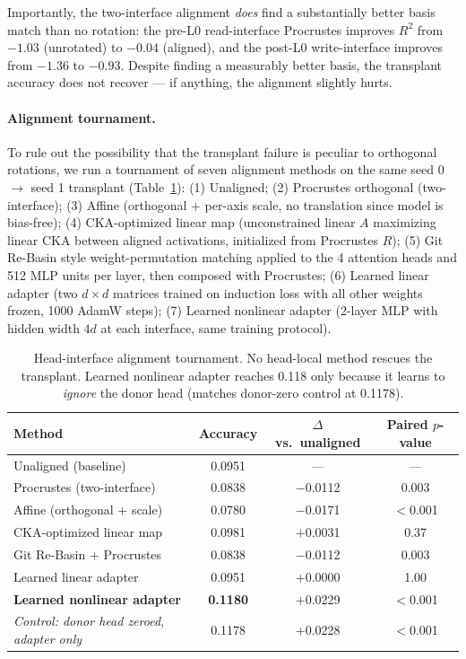 \documentclass[final]{article}
\begin{document}
Importantly, the two-interface alignment \emph{does} find a substantially
better basis match than no rotation: the pre-L0 read-interface Procrustes
improves $R^2$ from $-1.03$ (unrotated) to $-0.04$ (aligned), and the post-L0
write-interface improves from $-1.36$ to $-0.93$. Despite finding a measurably
better basis, the transplant accuracy does not recover --- if anything, the
alignment slightly hurts.

\paragraph{Alignment tournament.}
To rule out the possibility that the transplant failure is peculiar to
orthogonal rotations, we run a tournament of seven alignment methods on the
same seed 0 $\to$ seed 1 transplant (Table~\ref{tab:alignment_tournament}):
(1) Unaligned; (2) Procrustes orthogonal (two-interface); (3) Affine
(orthogonal + per-axis scale, no translation since model is bias-free);
(4) CKA-optimized linear map (unconstrained linear $A$ maximizing linear CKA
between aligned activations, initialized from Procrustes $R$); (5) Git Re-Basin
style weight-permutation matching \citep{ainsworth2022git} applied to the 4
attention heads and 512 MLP units per layer, then composed with Procrustes;
(6) Learned linear adapter (two $d \times d$ matrices trained on induction
loss with all other weights frozen, 1000 AdamW steps); (7) Learned nonlinear
adapter (2-layer MLP with hidden width $4d$ at each interface, same training
protocol).

\begin{table}[h]
\centering
\small
\caption{Head-interface alignment tournament. No head-local method rescues the
transplant. Learned
nonlinear adapter reaches 0.118 only because it learns to \emph{ignore} the
donor head (matches donor-zero control at 0.1178).}
\label{tab:alignment_tournament}
\begin{tabular}{lccc}
\toprule
Method & Accuracy & $\Delta$ vs.\ unaligned & Paired $p$-value \\
\midrule
Unaligned (baseline) & 0.0951 & --- & --- \\
Procrustes (two-interface) & 0.0838 & $-$0.0112 & 0.003 \\
Affine (orthogonal + scale) & 0.0780 & $-$0.0171 & $<$0.001 \\
CKA-optimized linear map & 0.0981 & $+$0.0031 & 0.37 \\
Git Re-Basin + Procrustes & 0.0838 & $-$0.0112 & 0.003 \\
Learned linear adapter & 0.0951 & $+$0.0000 & 1.00 \\
\textbf{Learned nonlinear adapter} & \textbf{0.1180} & $+$0.0229 & $<$0.001 \\
\midrule
\emph{Control: donor head zeroed, adapter only} & 0.1178 & $+$0.0228 & $<$0.001 \\
\bottomrule
\end{tabular}
\end{table}
\end{document}
